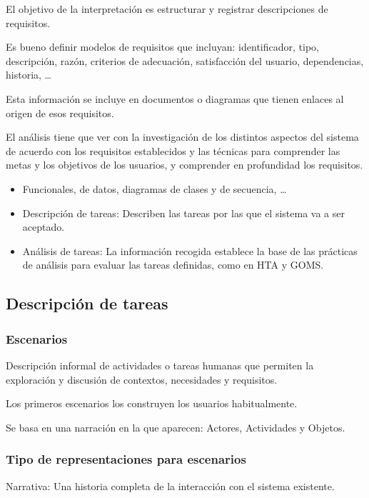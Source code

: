 \documentclass[12pt, twoside, openright]{report} %
\begin{document}
El objetivo de la interpretación es estructurar y registrar
descripciones de requisitos.

Es bueno definir modelos de requisitos que incluyan: identificador,
tipo, descripción, razón, criterios de adecuación, satisfacción del
usuario, dependencias, historia, \ldots{}

Esta información se incluye en documentos o diagramas que tienen
enlaces al origen de esos requisitos.

El análisis tiene que ver con la investigación de los distintos
aspectos del sistema de acuerdo con los requisitos establecidos y
las técnicas para comprender las metas y los objetivos de los
usuarios, y comprender en profundidad los requisitos.

\begin{itemize}
	\item Funcionales, de datos, diagramas de clases y de secuencia,
	      \ldots{}
	\item Descripción de tareas: Describen las tareas por las que el sistema
	      va a ser aceptado.
	\item Análisis de tareas: La información recogida establece la base de
	      las prácticas de análisis para evaluar las tareas definidas, como
	      en HTA y GOMS.
\end{itemize}

\subsection{Descripción de tareas}

\subsubsection{Escenarios}

Descripción informal de actividades o tareas humanas que permiten
la exploración y discusión de contextos, necesidades y requisitos.

Los primeros escenarios los construyen los usuarios habitualmente.

Se basa en una narración en la que aparecen: Actores, Actividades
y Objetos.

\subsubsection{Tipo de representaciones para escenarios}


Narrativa: Una historia completa de la interacción con el sistema
existente.
\end{document}
